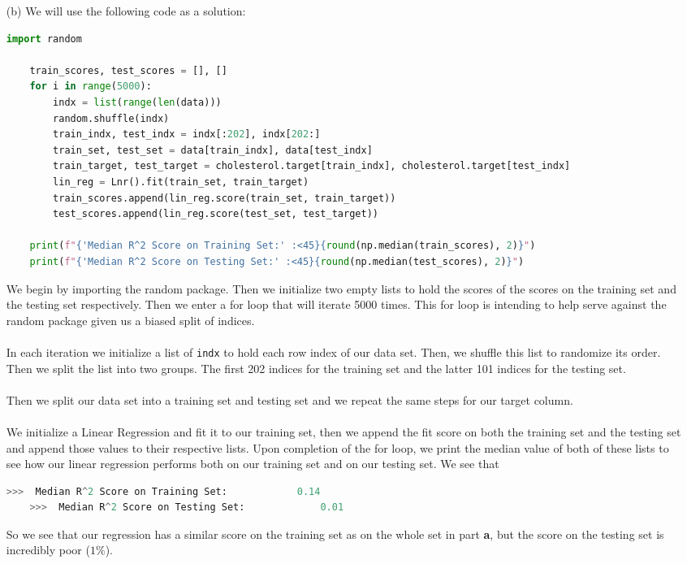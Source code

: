 \documentclass[12pt, letterpaper]{article}
\begin{document}
\begin{enumerate}
\newpage
    \item [(b)] We will use the following code as a solution:
\begin{lstlisting}[language=python]
    import random

    train_scores, test_scores = [], []
    for i in range(5000):
        indx = list(range(len(data)))
        random.shuffle(indx)
        train_indx, test_indx = indx[:202], indx[202:]
        train_set, test_set = data[train_indx], data[test_indx]
        train_target, test_target = cholesterol.target[train_indx], cholesterol.target[test_indx]
        lin_reg = Lnr().fit(train_set, train_target)
        train_scores.append(lin_reg.score(train_set, train_target))
        test_scores.append(lin_reg.score(test_set, test_target))
        
    print(f"{'Median R^2 Score on Training Set:' :<45}{round(np.median(train_scores), 2)}")
    print(f"{'Median R^2 Score on Testing Set:' :<45}{round(np.median(test_scores), 2)}")
\end{lstlisting}
    We begin by importing the random package. Then we initialize two empty lists to hold the scores 
    of the scores on the training set and the testing set respectively. Then we enter a for loop that 
    will iterate 5000 times. This for loop is intending to help serve against the random package 
    given us a biased split of indices. \\ \\
    In each iteration we initialize a list of \texttt{indx} to hold each row index of our data set.
    Then, we shuffle this list to randomize its order. Then we split the list into two groups. The first 
    202 indices for the training set and the latter 101 indices for the testing set. \\ \\
    Then we split our data set into a training set and testing set and we repeat the same steps 
    for our target column. \\ \\
    We initialize a Linear Regression and fit it to our training set, then we append the fit score on 
    both the training set and the testing set and append those values to their respective lists. Upon
    completion of the for loop, we print the median value of both of these lists to see how our linear 
    regression performs both on our training set and on our testing set. We see that 
\begin{lstlisting}[language=python]
    >>>  Median R^2 Score on Training Set:            0.14
    >>>  Median R^2 Score on Testing Set:             0.01
\end{lstlisting}
    So we see that our regression has a similar score on the training set as on the whole set in part 
    {\bf a}, but the score on the testing set is incredibly poor ($1\%$). 
\end{enumerate}
\end{document}
